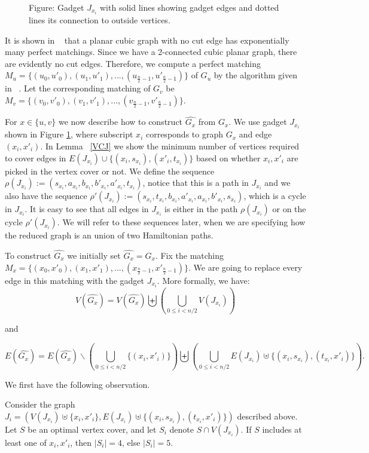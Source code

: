 \documentclass[svgnames]{llncs}
\begin{document}
{\begin{figure}[!ht]
\caption{Figure: Gadget $J_{x_i}$ with solid lines showing gadget edges and dotted lines its connection to outside vertices.}
 \label{J}
\end{figure}

It is shown in ~\cite{Chudnovsky08perfectmatchings} that a planar cubic graph with no cut edge has exponentially many perfect matchings. Since we have a 2-connected cubic planar graph, there are evidently no cut edges. Therefore, we compute a perfect matching $M_u=\{(u_0,u'_0),(u_1,u'_1 ),...,(u_{\frac{n}{2}-1},u'_{\frac{n}{2}-1})\}$
of $G_u$ by the algorithm given in ~\cite{4567800}. Let the corresponding matching of $G_v$ be $M_v=\{(v_0,v'_0),(v_1,v'_1),...,(v_{\frac{n}{2}-1},v'_{\frac{n}{2}-1})\}$.



For $x \in \{u,v\}$ we now describe how to construct $\hat{G_x}$ from $G_x$. We use gadget $J_{x_i}$ shown in Figure \ref{J}, where subscript $x_i$ corresponds to graph $G_x$ and edge $(x_i,x'_i)$. In Lemma ~\ref{VCJ}
we show the minimum number of vertices required to cover edges in $E(J_{x_i}) \cup \{(x_i,s_{x_i}),(x'_i,t_{x_i})\}$ based on whether $x_i,x'_i$ are picked in the vertex cover or not. We define the sequence
$\rho(J_{x_i}):=(s_{x_i},a_{x_i},b_{x_i},b'_{x_i},a'_{x_i},t_{x_i})$, notice that this is a path in $J_{x_i}$ and we also have the sequence $\rho'(J_{x_i}):=(s_{x_i},t_{x_i},b_{x_i},a'_{x_i},a_{x_i},b'_{x_i},s_{x_i})$, which is a cycle in $J_{x_i}$. It is easy to see that all edges in $J_{x_i}$ is either in the path $\rho(J_{x_i})$ or on the cycle $\rho'(J_{x_i})$. We will refer to these sequences later, when we are specifying how the reduced graph is an union of two Hamiltonian paths. 


To construct $\hat{G_x}$ we initially set $\hat{G_x}=G_x$.
Fix the matching $M_x=\{(x_0,x'_0),(x_1,x'_1 ),...,(x_{\frac{n}{2}-1},x'_{\frac{n}{2}-1})\}$. We are going to replace every edge in this matching with the gadget $J_{x_i}$. More formally, we have:
$$V(\hat{G_x})=V(\hat{G_x}) \biguplus \left( \bigcup_{0 \leq i < n/2} V(J_{x_i}) \right)$$ 

and  

$$E(\hat{G_x})=E(\hat{G_x}) \smallsetminus \left( \bigcup_{0 \leq i < n/2} \{(x_i,x'_i)\} \right) \biguplus \left( \bigcup_{0 \leq i < n/2} E(J_{x_i}) \uplus \{(x_i,s_{x_i}),(t_{x_i},x'_i)\} \right).$$

We first have the following observation.



\begin{lemma}
Consider the graph $J_i=(V(J_{x_i})\uplus \{x_i,x'_i\},E(J_{x_i})\uplus \{(x_i,s_{x_i}),(t_{x_i},x'_i)\})$ described above. Let $S$ be an optimal vertex cover, and let $S_i$ denote $S \cap V(J_{x_i})$. If $S$ includes at least one of $x_i,x'_i$, then $|S_i| = 4$, else $|S_i| = 5$.
\label{VCJ}
\end{lemma}

}
\end{document}
